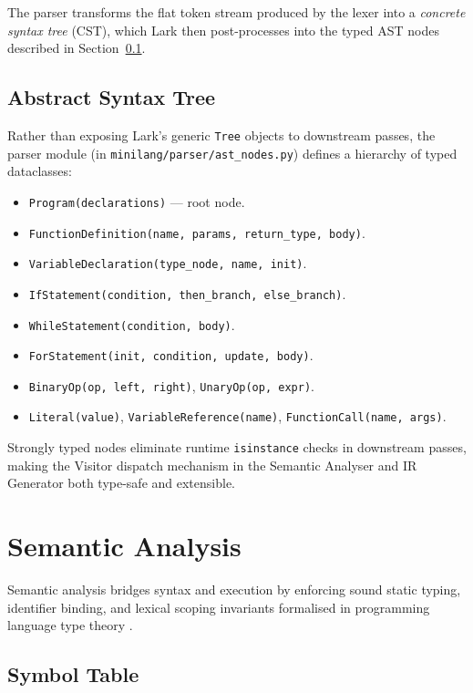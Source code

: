\documentclass[conference]{IEEEtran}
\begin{document}
The parser transforms the flat token stream produced by the lexer into
a \textit{concrete syntax tree} (CST), which Lark then post-processes
into the typed AST nodes described in Section~\ref{sec:ast}.

\subsection{Abstract Syntax Tree}
\label{sec:ast}

Rather than exposing Lark's generic \texttt{Tree} objects to downstream
passes, the parser module (in \texttt{minilang/parser/ast\_nodes.py})
defines a hierarchy of typed dataclasses:

\begin{itemize}
  \item \texttt{Program(declarations)} --- root node.
  \item \texttt{FunctionDefinition(name, params, return\_type, body)}.
  \item \texttt{VariableDeclaration(type\_node, name, init)}.
  \item \texttt{IfStatement(condition, then\_branch, else\_branch)}.
  \item \texttt{WhileStatement(condition, body)}.
  \item \texttt{ForStatement(init, condition, update, body)}.
  \item \texttt{BinaryOp(op, left, right)}, \texttt{UnaryOp(op, expr)}.
  \item \texttt{Literal(value)}, \texttt{VariableReference(name)},
        \texttt{FunctionCall(name, args)}.
\end{itemize}

Strongly typed nodes eliminate runtime \texttt{isinstance} checks in
downstream passes, making the Visitor dispatch mechanism in the
Semantic Analyser and IR Generator both type-safe and extensible.

\section{Semantic Analysis}
\label{sec:semantic}

Semantic analysis bridges syntax and execution by enforcing sound static
typing, identifier binding, and lexical scoping invariants formalised in
programming language type theory \cite{pierce2002}.

\subsection{Symbol Table}
\end{document}
